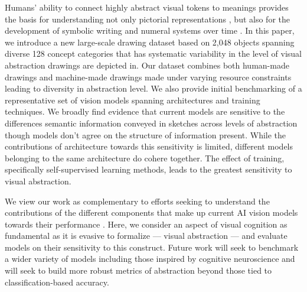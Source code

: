 \documentclass[10pt,letterpaper]{article}
\begin{document}
Humans' ability to connect highly abstract visual tokens to meanings provides the basis for understanding not only pictorial representations \cite{hawkins2021visual, garrod2007foundations}, but also for the development of symbolic writing and numeral systems over time \cite{schmandt2010writing, chrisomalis2020reckonings}. 
In this paper, we introduce a new large-scale drawing dataset based on 2,048 objects spanning diverse 128 concept categories that has systematic variability in the level of visual abstraction drawings are depicted in.
Our dataset combines both human-made drawings and machine-made drawings made under varying resource constraints leading to diversity in abstraction level.
We also provide initial benchmarking of a representative set of vision models spanning architectures and training techniques. We broadly find evidence that current models are sensitive to the differences semantic information conveyed in sketches across levels of abstraction though models don't agree on the structure of information present.
While the contributions of architecture towards this sensitivity is limited, different models belonging to the same architecture do cohere together.
The effect of training, specifically self-supervised learning methods, leads to the greatest sensitivity to visual abstraction.

We view our work as complementary to efforts seeking to understand the contributions of the different components that make up current AI vision models towards their performance \cite{hermann2020shapes, nguyen2020wide,schott2021visual,chen2021intriguing}. Here, we consider an aspect of visual cognition as fundamental as it is evasive to formalize — visual abstraction — and evaluate models on their sensitivity to this construct. Future work will seek to benchmark a wider variety of models including those inspired by cognitive neuroscience \cite{chen2022unsupervised, zhuang2021unsupervised,kubilius2019brain} and will seek to build more robust metrics of abstraction beyond those tied to classification-based accuracy.






\setlength{\bibleftmargin}{.125in}
\setlength{\bibindent}{-\bibleftmargin}


\end{document}
